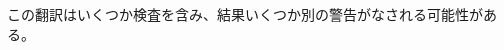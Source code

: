 \documentclass[\pformat,12pt]{jarticle}
\newcommand{\vdmpp}{VDM++}
\begin{document}
この翻訳はいくつか検査を含み、結果いくつか別の警告がなされる可能性がある。
\end{document}
